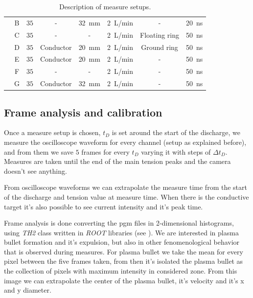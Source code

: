 \begin{table}
\begin{tabular}{cccccccc}
                            &B  &$\num{35}$ &-  &\SI{32}{\milli\meter}  &\SI{2}{\liter/\minute} &-  &\SI{20}{\nano\second}\\
                            &C  &$\num{35}$ &-  &-  &\SI{2}{\liter/\minute} &Floating ring  &\SI{50}{\nano\second}\\
                            &D  &$\num{35}$ &Conductor  &\SI{20}{\milli\meter}  &\SI{2}{\liter/\minute} &Ground ring  &\SI{50}{\nano\second}\\
                            &E  &$\num{35}$ &Conductor  &\SI{20}{\milli\meter}  &\SI{2}{\liter/\minute} &-  &\SI{50}{\nano\second}\\
                            &F  &$\num{35}$ &-  &-  &\SI{2}{\liter/\minute} &-  &\SI{50}{\nano\second}\\
                            &G  &$\num{35}$ &Conductor  &\SI{32}{\milli\meter}  &\SI{2}{\liter/\minute} &-  &\SI{50}{\nano\second}\\
  \bottomrule
 \end{tabular}
 \caption{Description of measure setups.}
 \label{tab:setups}
\end{table}


\subsection{Frame analysis and calibration}
Once a measure setup is chosen, $t_D$ is set around the start of the discharge, we measure the oscilloscope waveform for every channel (setup as explained before), and from them we save $5$ frames for every $t_D$ varying it with steps of $\Delta t_D$. Measures are taken until the end of the main tension peaks and the camera doesn't see anything.


From oscilloscope waveforms we can extrapolate the measure time from the start of the discharge and tension value at measure time. When there is the conductive target it's also possible to see current intensity and it's peak time.

Frame analysis is done converting the pgm files in 2-dimensional histograms, using \emph{TH2} class written in \emph{ROOT} libraries (see \cite{ROOT:TH2}).
We are interested in plasma bullet formation and it's expulsion, but also in other fenomenological behavior that is observed during measures.
For plasma bullet we take the mean for every pixel between the five frames taken, from then it's isolated the plasma bullet as the collection of pixels with maximum intensity in considered zone. From this image we can extrapolate the center of the plasma bullet, it's velocity and it's x and y diameter.


